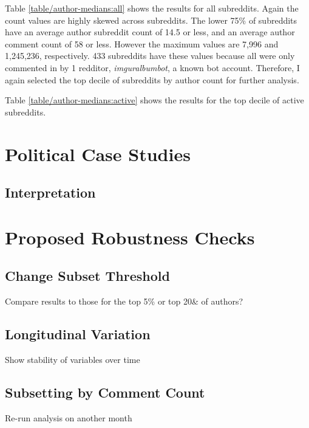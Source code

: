 \documentclass{article}
\begin{document}
Table \ref{table/author-medians:all} shows the results for all subreddits. Again the count values are highly skewed across subreddits. The lower 75\% of subreddits have an average author subreddit count of 14.5 or less, and an average author comment count of 58 or less. However the maximum values are 7,996 and 1,245,236, respectively. 433 subreddits have these values because all were only commented in by 1 redditor, \textit{imguralbumbot}, a known bot account. Therefore, I again selected the top decile of subreddits by author count for further analysis.

Table \ref{table/author-medians:active} shows the results for the top decile of active subreddits. 






\section{Political Case Studies}


\subsection{Interpretation}



















\section{Proposed Robustness Checks}

\subsection{Change Subset Threshold}

Compare results to those for the top 5\% or top 20\& of authors?

\subsection{Longitudinal Variation}

Show stability of variables over time

\subsection{Subsetting by Comment Count}

Re-run analysis on another month
\end{document}
